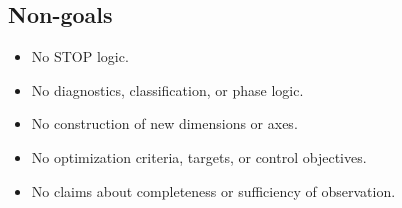 \subsection{Non-goals}
\begin{itemize}
  \item No STOP logic.
  \item No diagnostics, classification, or phase logic.
  \item No construction of new dimensions or axes.
  \item No optimization criteria, targets, or control objectives.
  \item No claims about completeness or sufficiency of observation.
\end{itemize}
